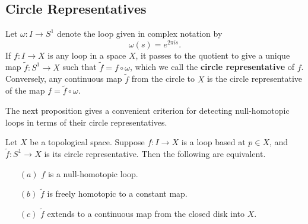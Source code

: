 \subsection{Circle Representatives}
Let $\omega:I\to S^1$ denote the loop given in complex notation by
\[\omega(s)=e^{2\pi is}.\]
If $f:I\to X$ is any loop in a space $X$, it passes to the quotient to give a unique map $\widetilde{f}:S^1\to X$ such that $\widetilde{f}=f\circ\omega$, which we call the \textbf{circle representative} of $f$. Conversely, any continuous map $\widetilde{f}$ from the circle to $X$ is the circle representative of the map $f=\widetilde{f}\circ\omega$.\par
The next proposition gives a convenient criterion for detecting null-homotopic loops in terms of their circle representatives.
\begin{proposition}\label{null homotopy iff}
Let $X$ be a topological space. Suppose $f:I\to X$ is a loop based at $p\in X$, and $\widetilde{f}:S^1\to X$ is its circle representative. Then the following are equivalent.
\begin{itemize}
\item[$(a)$] $f$ is a null-homotopic loop.
\item[$(b)$] $\widetilde{f}$ is freely homotopic to a constant map.
\item[$(c)$] $\widetilde{f}$ extends to a continuous map from the closed disk into $X$.
\end{itemize}
\end{proposition}
